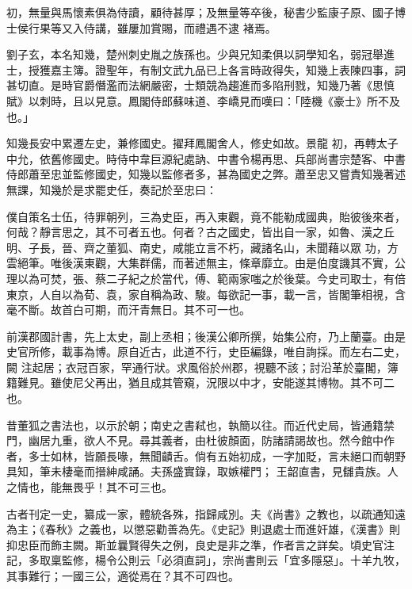 \begin{pinyinscope}
 初，無量與馬懷素俱為侍讀，顧待甚厚；及無量等卒後，秘書少監康子原、國子博士侯行果等又入侍講，雖屢加賞賜，而禮遇不逮
 褚焉。



 劉子玄，本名知幾，楚州刺史胤之族孫也。少與兄知柔俱以詞學知名，弱冠舉進士，授獲嘉主簿。證聖年，有制文武九品已上各言時政得失，知幾上表陳四事，詞甚切直。是時官爵僭濫而法網嚴密，士類競為趨進而多陷刑戮，知幾乃著《思慎賦》以刺時，且以見意。鳳閣侍郎蘇味道、李嶠見而嘆曰：「陸機《豪士》所不及也。」



 知幾長安中累遷左史，兼修國史。擢拜鳳閣舍人，修史如故。景龍
 初，再轉太子中允，依舊修國史。時侍中韋巨源紀處訥、中書令楊再思、兵部尚書宗楚客、中書侍郎蕭至忠並監修國史，知幾以監修者多，甚為國史之弊。蕭至忠又嘗責知幾著述無課，知幾於是求罷史任，奏記於至忠曰：



 僕自策名士伍，待罪朝列，三為史臣，再入東觀，竟不能勒成國典，貽彼後來者，何哉？靜言思之，其不可者五也。何者？古之國史，皆出自一家，如魯、漢之丘明、子長，晉、齊之董狐、南史，咸能立言不朽，藏諸名山，未聞藉以眾
 功，方雲絕筆。唯後漢東觀，大集群儒，而著述無主，條章靡立。由是伯度譏其不實，公理以為可焚，張、蔡二子紀之於當代，傅、範兩家嗤之於後葉。今史司取士，有倍東京，人自以為荀、袁，家自稱為政、駿。每欲記一事，載一言，皆閣筆相視，含毫不斷。故首白可期，而汗青無日。其不可一也。



 前漢郡國計書，先上太史，副上丞相；後漢公卿所撰，始集公府，乃上蘭臺。由是史官所修，載事為博。原自近古，此道不行，史臣編錄，唯自詢採。而左右二史，闕
 注起居；衣冠百家，罕通行狀。求風俗於州郡，視聽不該；討沿革於臺閣，簿籍難見。雖使尼父再出，猶且成其管窺，況限以中才，安能遂其博物。其不可二也。



 昔董狐之書法也，以示於朝；南史之書弒也，執簡以往。而近代史局，皆通籍禁門，幽居九重，欲人不見。尋其義者，由杜彼顏面，防諸請謁故也。然今館中作者，多士如林，皆願長喙，無聞䶦舌。倘有五始初成，一字加貶，言未絕口而朝野具知，筆未棲毫而搢紳咸誦。夫孫盛實錄，取嫉權門；
 王韶直書，見讎貴族。人之情也，能無畏乎！其不可三也。



 古者刊定一史，纂成一家，體統各殊，指歸咸別。夫《尚書》之教也，以疏通知遠為主；《春秋》之義也，以懲惡勸善為先。《史記》則退處士而進奸雄，《漢書》則抑忠臣而飾主闕。斯並曩賢得失之例，良史是非之準，作者言之詳矣。頃史官注記，多取稟監修，楊令公則云「必須直詞」，宗尚書則云「宜多隱惡」。十羊九牧，其事難行；一國三公，適從焉在？其不可四也。




\end{pinyinscope}
